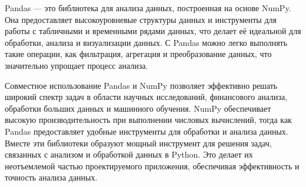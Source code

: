 Pandas --- это библиотека для анализа данных, построенная на основе NumPy. Она предоставляет высокоуровневые структуры данных и инструменты для работы с табличными и временными рядами данных, что делает её идеальной для обработки, анализа и визуализации данных. С Pandas можно легко выполнять такие операции, как фильтрация, агрегация и преобразование данных, что значительно упрощает процесс анализа.

Совместное использование Pandas и NumPy позволяет эффективно решать широкий спектр задач в области научных исследований, финансового анализа, обработки больших данных и машинного обучения. NumPy обеспечивает высокую производительность при выполнении числовых вычислений, тогда как Pandas предоставляет удобные инструменты для обработки и анализа данных. Вместе эти библиотеки образуют мощный инструмент для решения задач, связанных с анализом и обработкой данных в Python. Это делает их неотъемлемой частью проектируемого приложения, обеспечивая эффективность и точность анализа данных.







